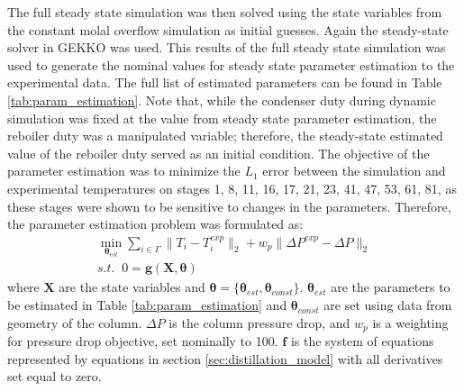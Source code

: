 The full steady state simulation was then solved using the state variables from the constant molal overflow simulation as initial guesses. Again the steady-state solver in  GEKKO was used. This results of the full steady state simulation was used to generate the nominal values for steady state parameter estimation to the experimental data. The full list of estimated parameters can be found in Table \ref{tab:param_estimation}. Note that, while the condenser duty during dynamic simulation was fixed at the value from steady state parameter estimation, the reboiler duty was a manipulated variable; therefore, the steady-state estimated value of the reboiler duty served as an initial condition. The objective of the parameter estimation was to minimize the $L_1$ error between the simulation and experimental temperatures on stages 1, 8, 11, 16, 17, 21, 23, 41, 47, 53, 61, 81, as these stages were shown to be sensitive to changes in the parameters. Therefore, the parameter estimation problem was formulated as:
\begin{subequations}
    \begin{align}
        \min_{\boldsymbol \theta_{est}} \sum_{i \in \Gamma} \lVert T_i-T_i^{exp}\rVert_2 + w_p \lVert \Delta P^{exp} - \Delta P \rVert_2 \\
        s.t. \;\; 0 = \mathbf g(\mathbf X, \boldsymbol \theta)
    \end{align}
\end{subequations}
where $\mathbf X$ are the state variables and $\boldsymbol \theta = \{\boldsymbol \theta_{est}, \boldsymbol \theta_{const} \}$.  $\boldsymbol \theta_{est}$ are the parameters to be estimated in Table \ref{tab:param_estimation} and $\boldsymbol \theta_{const}$ are set using data from geometry of the column. $\Delta P$ is the column pressure drop, and $w_p$ is a weighting for pressure drop objective, set nominally to 100.  $\mathbf f$ is the system of equations represented by equations in section \ref{sec:distillation_model} with all derivatives set equal to zero. 
